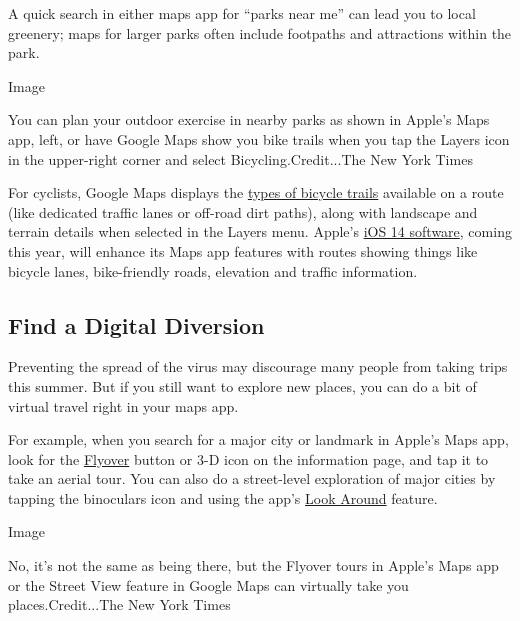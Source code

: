 A quick search in either maps app for ``parks near me'' can lead you to
local greenery; maps for larger parks often include footpaths and
attractions within the park.

Image

You can plan your outdoor exercise in nearby parks as shown in Apple's
Maps app, left, or have Google Maps show you bike trails when you tap
the Layers icon in the upper-right corner and select
Bicycling.Credit...The New York Times

For cyclists, Google Maps displays the
\href{https://support.google.com/maps/answer/3092439?co=GENIE.Platform\%3DAndroid\&hl=en\&oco=1}{types
of bicycle trails} available on a route (like dedicated traffic lanes or
off-road dirt paths), along with landscape and terrain details when
selected in the Layers menu. Apple's
\href{https://www.apple.com/ios/ios-14-preview/features/}{iOS 14
software}, coming this year, will enhance its Maps app features with
routes showing things like bicycle lanes, bike-friendly roads, elevation
and traffic information.

\hypertarget{find-a-digital-diversion}{%
\subsection{Find a Digital Diversion}\label{find-a-digital-diversion}}

Preventing the spread of the virus may discourage many people from
taking trips this summer. But if you still want to explore new places,
you can do a bit of virtual travel right in your maps app.

For example, when you search for a major city or landmark in Apple's
Maps app, look for the
\href{https://support.apple.com/guide/iphone/take-flyover-tours-in-maps-iph81a3f978/ios}{Flyover}
button or 3-D icon on the information page, and tap it to take an aerial
tour. You can also do a street-level exploration of major cities by
tapping the binoculars icon and using the app's
\href{https://support.apple.com/guide/iphone/look-around-iph65703a702/ios}{Look
Around} feature.

Image

No, it's not the same as being there, but the Flyover tours in Apple's
Maps app or the Street View feature in Google Maps can virtually take
you places.Credit...The New York Times

